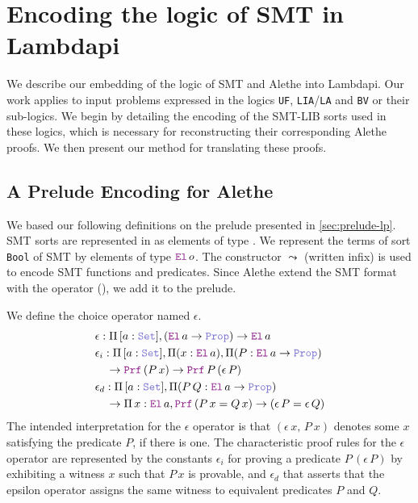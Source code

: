
\chapter{Encoding the logic of SMT in Lambdapi} \label{ch:encoding}

We describe our embedding of the logic of SMT and Alethe into Lambdapi.
Our work applies to input problems expressed in the logics \texttt{UF}, \texttt{LIA}/\texttt{LA} and \texttt{BV} or their sub-logics.
We begin by detailing the encoding of the SMT-LIB sorts used in these logics, which is necessary for reconstructing their corresponding Alethe proofs.
We then present our method for translating these proofs.

\section{A Prelude Encoding for Alethe}
\label{sec:encoding-prelude}

We based our following definitions on the prelude presented in \cref{sec:prelude-lp}.
SMT sorts are represented in \lpm{} as elements of type \set{}. We represent the terms of sort \lstinline[language=SMT,basicstyle=\ttfamily\normalsize]|Bool| of SMT by elements of type $\el{}\,o$.
The constructor $\leadsto$ (written infix) is used to encode SMT functions and predicates.
Since Alethe extend the SMT format with the  operator (\cite[\S 2.1]{alethespec}), we add it to the prelude. 

\begin{definition} \label{def:eps}
We define the choice operator named $\epsilon$.
\begin{align}
& \epsilon: \Pi\, {[a: \set]}, (\el\,a \ra \prop) \ra \el\,a \\
& \epsilon_i: \Pi\, {[a: \set]}, \Pi (x : \el\,a), \Pi (P : \el\,a \ra \prop) \\
& \quad \ra \prf\,(P\,x) \ra \prf\, P\,(\epsilon\,P) \\
& \epsilon_{d}: \Pi\, {[a: \set]}, \Pi (P\,Q : \el\,a \ra \prop) \\
& \quad \ra \Pi\, x : \el\,a, \prf\,(P\,x = Q\,x) \ra (\epsilon \, P = \epsilon \, Q)
\end{align}
The intended interpretation for the $\epsilon$ operator is that $(\epsilon\,x,\, P~x)$ denotes some $x$ satisfying the predicate $P$, if there is one.
The characteristic proof rules for the $\epsilon$ operator are represented by the constants $\epsilon_i$ for proving a predicate $P\,(\epsilon\,P)$ by exhibiting a witness $x$ such that $P\,x$ is provable,
and $\epsilon_d$ that asserts that the epsilon operator assigns the same witness to equivalent predicates $P$ and $Q$.
\end{definition}


